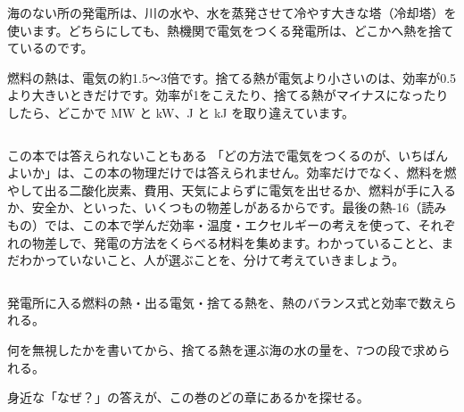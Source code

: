 海のない所の発電所は、川の水や、水を蒸発させて冷やす大きな塔（冷却塔）を使います。どちらにしても、熱機関で電気をつくる発電所は、どこかへ熱を捨てているのです。
\begin{phketa}[発電所の熱]
燃料の熱は、電気の約1.5〜3倍です。捨てる熱が電気より小さいのは、効率が0.5より大きいときだけです。効率が1をこえたり、捨てる熱がマイナスになったりしたら、どこかで MW と kW、J と kJ を取り違えています。
\end{phketa}

\begin{column}{この本では答えられないこともある}
「どの方法で電気をつくるのが、いちばんよいか」は、この本の物理だけでは答えられません。効率だけでなく、燃料を燃やして出る二酸化炭素、費用、天気によらずに電気を出せるか、燃料が手に入るか、安全か、といった、いくつもの物差しがあるからです。最後の熱-16（読みもの）では、この本で学んだ効率・温度・エクセルギーの考えを使って、それぞれの物差しで、発電の方法をくらべる材料を集めます。わかっていることと、まだわかっていないこと、人が選ぶことを、分けて考えていきましょう。
\end{column}

\begin{kotoba}\small
{}
\end{kotoba}

\begin{furikaeri}
\begin{checklist}
\item 発電所に入る燃料の熱・出る電気・捨てる熱を、熱のバランス式と効率で数えられる。
\item 何を無視したかを書いてから、捨てる熱を運ぶ海の水の量を、7つの段で求められる。
\item 身近な「なぜ？」の答えが、この巻のどの章にあるかを探せる。
\end{checklist}
\end{furikaeri}
